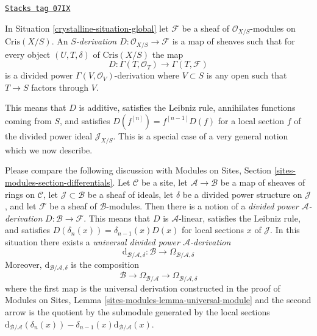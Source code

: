 \begin{definition}
\label{crystalline-definition-global-derivation}
\href{https://stacks.math.columbia.edu/tag/07IX}{\texttt{Stacks tag 07IX}}

In Situation \ref{crystalline-situation-global} let
$\mathcal{F}$ be a sheaf of $\mathcal{O}_{X/S}$-modules on
$\text{Cris}(X/S)$. An
{\it $S$-derivation $D : \mathcal{O}_{X/S} \to \mathcal{F}$}
is a map of sheaves such that for every object $(U, T, \delta)$ of
$\text{Cris}(X/S)$ the map
$$
D : \Gamma(T, \mathcal{O}_T) \longrightarrow \Gamma(T, \mathcal{F})
$$
is a divided power $\Gamma(V, \mathcal{O}_V)$-derivation where $V \subset S$
is any open such that $T \to S$ factors through $V$.
\end{definition}

This means that $D$ is additive, satisfies the Leibniz rule, annihilates
functions coming from $S$, and satisfies $D(f^{[n]}) = f^{[n - 1]}D(f)$
for a local section $f$ of the divided power ideal $\mathcal{J}_{X/S}$.
This is a special case of a very general notion which we now describe.

\medskip\noindent
Please compare the following discussion with
Modules on Sites, Section \ref{sites-modules-section-differentials}. Let
$\mathcal{C}$ be a site, let $\mathcal{A} \to \mathcal{B}$ be a
map of sheaves of rings on $\mathcal{C}$, let $\mathcal{J} \subset \mathcal{B}$
be a sheaf of ideals, let $\delta$ be a divided power structure on
$\mathcal{J}$, and let $\mathcal{F}$ be a sheaf of $\mathcal{B}$-modules.
Then there is a notion of a {\it divided power $\mathcal{A}$-derivation}
$D : \mathcal{B} \to \mathcal{F}$. This means that $D$ is $\mathcal{A}$-linear,
satisfies the Leibniz rule, and satisfies
$D(\delta_n(x)) = \delta_{n - 1}(x)D(x)$ for local sections $x$ of
$\mathcal{J}$. In this situation there exists a
{\it universal divided power $\mathcal{A}$-derivation}
$$
\text{d}_{\mathcal{B}/\mathcal{A}, \delta} :
\mathcal{B}
\longrightarrow
\Omega_{\mathcal{B}/\mathcal{A}, \delta}
$$
Moreover, $\text{d}_{\mathcal{B}/\mathcal{A}, \delta}$ is the composition
$$
\mathcal{B}
\longrightarrow
\Omega_{\mathcal{B}/\mathcal{A}}
\longrightarrow
\Omega_{\mathcal{B}/\mathcal{A}, \delta}
$$
where the first map is the universal derivation constructed in the proof
of Modules on Sites, Lemma \ref{sites-modules-lemma-universal-module}
and the second arrow is the quotient by the submodule generated by
the local sections
$\text{d}_{\mathcal{B}/\mathcal{A}}(\delta_n(x)) -
\delta_{n - 1}(x)\text{d}_{\mathcal{B}/\mathcal{A}}(x)$.

